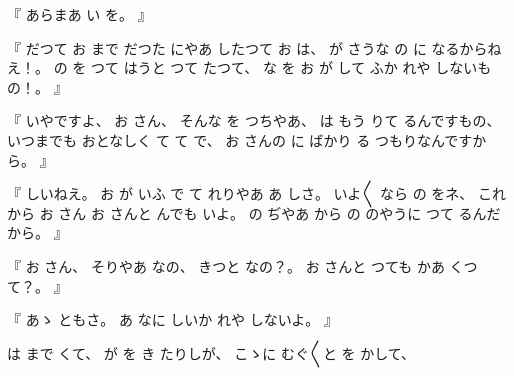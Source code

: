 %
『
あらまあ
い
を。
』

%
『
だつて
お
まで
だつた
にやあ
したつて
お
は、
%
が
さうな
の
に
なるからねえ！。
%
の
を
つて
はうと
つて
たつて、
%
な
を%
お
が
して
ふか
れや
しないもの！。
』

%
『
いやですよ、
%
お
さん、
%
そんな
を
つちやあ、
%
は
もう
りて
るんですもの、
%
いつまでも
おとなしく
て
て
で、
%
お
さんの
に
ばかり
る
つもりなんですから。
』

%
『
しいねえ。
%
お
が
いふ
で
て
れりやあ
あ
しさ。
%
いよ〳〵
なら
の
をネ、
%
これから
お
さん
お
さんと
んでも
いよ。
%
の
ぢやあ
から
の
のやうに
つて
るんだから。
』

%
『
お
さん、
%
そりやあ
なの、
%
きつと
なの？。
%
お
さんと
つても
かあ
くつて？。
』

%
『
あゝ
ともさ。
%
あ
なに
しいか
れや
しないよ。
』

%
は
まで
くて、
%
が
を
き
たりしが、
%
こゝに
むぐ〳〵と
を
かして、

